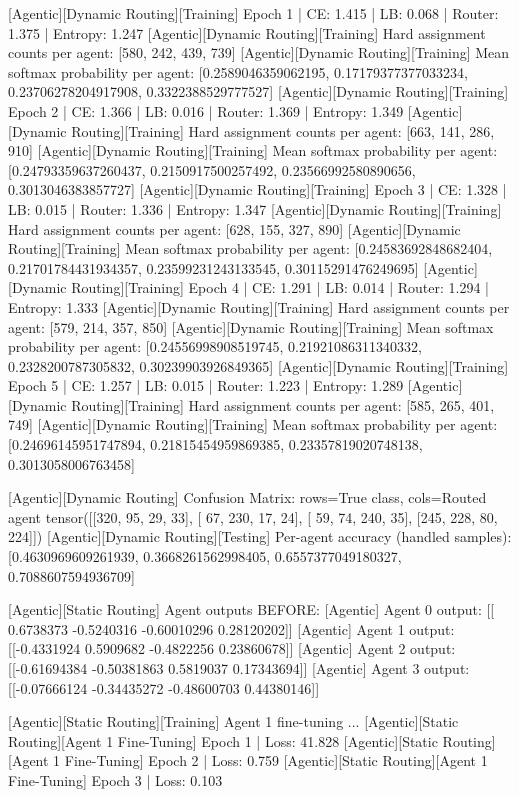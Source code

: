 [Agentic][Dynamic Routing][Training] Epoch 1 | CE: 1.415 | LB: 0.068 | Router: 1.375 | Entropy: 1.247
[Agentic][Dynamic Routing][Training] Hard assignment counts per agent: [580, 242, 439, 739]
[Agentic][Dynamic Routing][Training] Mean softmax probability per agent: [0.2589046359062195, 0.17179377377033234, 0.23706278204917908, 0.3322388529777527]
[Agentic][Dynamic Routing][Training] Epoch 2 | CE: 1.366 | LB: 0.016 | Router: 1.369 | Entropy: 1.349
[Agentic][Dynamic Routing][Training] Hard assignment counts per agent: [663, 141, 286, 910]
[Agentic][Dynamic Routing][Training] Mean softmax probability per agent: [0.24793359637260437, 0.2150917500257492, 0.23566992580890656, 0.3013046383857727]
[Agentic][Dynamic Routing][Training] Epoch 3 | CE: 1.328 | LB: 0.015 | Router: 1.336 | Entropy: 1.347
[Agentic][Dynamic Routing][Training] Hard assignment counts per agent: [628, 155, 327, 890]
[Agentic][Dynamic Routing][Training] Mean softmax probability per agent: [0.24583692848682404, 0.21701784431934357, 0.23599231243133545, 0.30115291476249695]
[Agentic][Dynamic Routing][Training] Epoch 4 | CE: 1.291 | LB: 0.014 | Router: 1.294 | Entropy: 1.333
[Agentic][Dynamic Routing][Training] Hard assignment counts per agent: [579, 214, 357, 850]
[Agentic][Dynamic Routing][Training] Mean softmax probability per agent: [0.24556998908519745, 0.21921086311340332, 0.2328200787305832, 0.30239903926849365]
[Agentic][Dynamic Routing][Training] Epoch 5 | CE: 1.257 | LB: 0.015 | Router: 1.223 | Entropy: 1.289
[Agentic][Dynamic Routing][Training] Hard assignment counts per agent: [585, 265, 401, 749]
[Agentic][Dynamic Routing][Training] Mean softmax probability per agent: [0.24696145951747894, 0.21815454959869385, 0.23357819020748138, 0.3013058006763458]

[Agentic][Dynamic Routing] Confusion Matrix: rows=True class, cols=Routed agent
tensor([[320,  95,  29,  33],
[ 67, 230,  17,  24],
[ 59,  74, 240,  35],
[245, 228,  80, 224]])
[Agentic][Dynamic Routing][Testing] Per-agent accuracy (handled samples): [0.4630969609261939, 0.3668261562998405, 0.6557377049180327, 0.7088607594936709]

[Agentic][Static Routing] Agent outputs BEFORE:
[Agentic] Agent 0 output: [[ 0.6738373  -0.5240316  -0.60010296  0.28120202]]
[Agentic] Agent 1 output: [[-0.4331924   0.5909682  -0.4822256   0.23860678]]
[Agentic] Agent 2 output: [[-0.61694384 -0.50381863  0.5819037   0.17343694]]
[Agentic] Agent 3 output: [[-0.07666124 -0.34435272 -0.48600703  0.44380146]]

[Agentic][Static Routing][Training] Agent 1 fine-tuning ...
[Agentic][Static Routing][Agent 1 Fine-Tuning] Epoch 1 | Loss: 41.828
[Agentic][Static Routing][Agent 1 Fine-Tuning] Epoch 2 | Loss: 0.759
[Agentic][Static Routing][Agent 1 Fine-Tuning] Epoch 3 | Loss: 0.103

